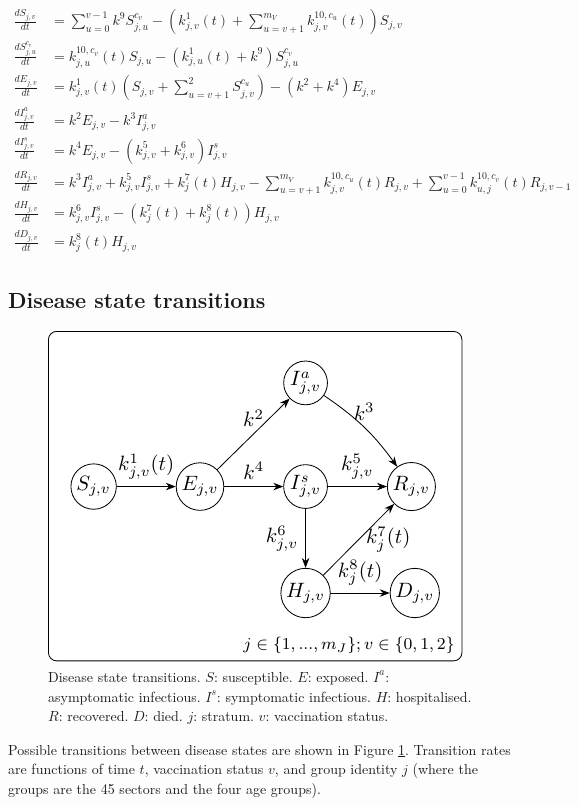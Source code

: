 \documentclass[
]{article}
\begin{document}
\begin{align}
\frac{dS_{j,v}}{dt} & = \sum_{u=0}^{v-1}k^9S_{j,u}^{c_v} - \left( k_{j,v}^{1}(t) + \sum_{u=v+1}^{{m_V}}k_{j,v}^{10,c_u}(t) \right)S_{j,v} \\
\frac{dS_{j,u}^{c_v}}{dt} & = k_{j,u}^{10,c_v}(t)S_{j,u} -\left( k_{j,u}^{1}(t) + k^9 \right)S_{j,u}^{c_v}  \\
\frac{dE_{j,v}}{dt} & = k_{j,v}^{1}(t)\left(S_{j,v}+\sum_{u=v+1}^2S_{j,v}^{c_u}\right) - (k^2+k^4)E_{j,v} \\
\frac{dI_{j,v}^a}{dt} & = k^2E_{j,v} - k^3I_{j,v}^a \\
\frac{dI_{j,v}^s}{dt} & = k^4E_{j,v} - (k_{j,v}^{5}+k_{j,v}^{6})I_{j,v}^s \\
\frac{dR_{j,v}}{dt} & = k^3I_{j,v}^a + k_{j,v}^{5}I_{j,v}^s + k_{j}^{7}(t) H_{j,v} - \sum_{u=v+1}^{{m_V}}k_{j,v}^{10,c_u}(t)R_{j,v} + \sum_{u=0}^{v-1}k_{u,j}^{10,c_v}(t)R_{j,v-1}\\
\frac{dH_{j,v}}{dt} & = k_{j,v}^{6}I_{j,v}^s - (k_{j}^{7}(t) + k_{j}^{8}(t)) H_{j,v} \\
\frac{dD_{j,v}}{dt} & =  k_{j}^{8}(t) H_{j,v}
\end{align}

\subsection{Disease state transitions}\label{disease-state-transitions}

\begin{figure}
\includegraphics[width=0.5\linewidth]{README_files/figure-latex/statetransitions-1} \caption{Disease state transitions. $S$: susceptible. $E$: exposed. $I^{a}$: asymptomatic infectious. $I^{s}$: symptomatic infectious. $H$: hospitalised. $R$: recovered. $D$: died. $j$: stratum. $v$: vaccination status.}\label{fig:statetransitions}
\end{figure}

Possible transitions between disease states are shown in Figure \ref{fig:statetransitions}. Transition rates are functions of time \(t\), vaccination status \(v\), and group identity \(j\) (where the groups are the 45 sectors and the four age groups).
\end{document}
